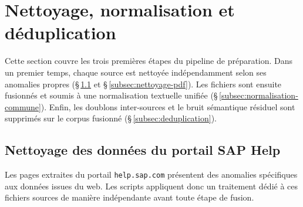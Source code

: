 \section{Nettoyage, normalisation et déduplication}
\label{sec:nettoyage}

Cette section couvre les trois premières étapes du pipeline de préparation. Dans un premier temps, chaque source est nettoyée indépendamment selon ses anomalies propres (§\,\ref{subsec:nettoyage-saphelp} et §\,\ref{subsec:nettoyage-pdf}). Les fichiers sont ensuite fusionnés et soumis à une normalisation textuelle unifiée (§\,\ref{subsec:normalisation-commune}). Enfin, les doublons inter-sources et le bruit sémantique résiduel sont supprimés sur le corpus fusionné (§\,\ref{subsec:deduplication}).
\subsection{Nettoyage des données du portail SAP Help}
\label{subsec:nettoyage-saphelp}

Les pages extraites du portail \texttt{help.sap.com} présentent des anomalies spécifiques aux données issues du web. Les scripts appliquent donc un traitement dédié à ces fichiers sources de manière indépendante avant toute étape de fusion.

\newcommand{\ptag}[2]{%
  \colorlet{ptagcol}{#1}%
  \tikz[baseline=-0.55ex]{%
    \node[rectangle, rounded corners=2pt,
          fill=ptagcol!15, draw=ptagcol!55, line width=0.45pt,
          font=\tiny\bfseries\sffamily, text=ptagcol!85!black,
          inner xsep=3pt, inner ysep=1.8pt, outer sep=2pt]{#2};%
  }%
}

